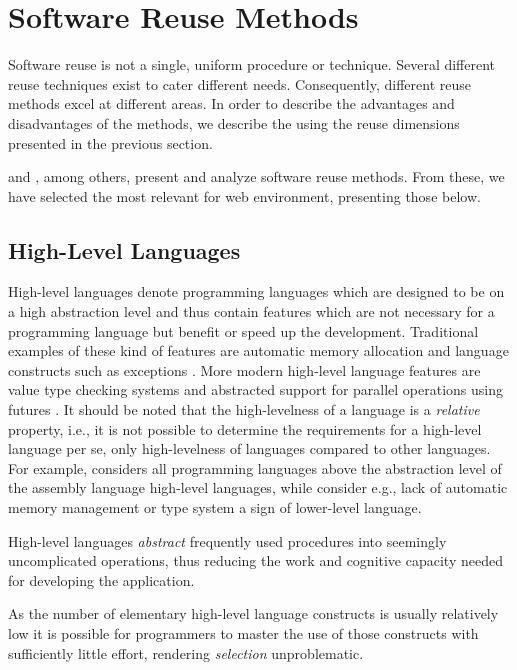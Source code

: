 \section{Software Reuse Methods}

Software reuse is not a single, uniform procedure or technique. Several different reuse techniques exist to cater different needs. Consequently, different reuse methods excel at different areas. In order to describe the advantages and disadvantages of the methods, we describe the using the reuse dimensions presented in the previous section.

\citet{krueger_software_1992} and \citet{johnson_frameworkscomponents+_1997}, among others, present and analyze software reuse methods. From these, we have selected the most relevant for web environment, presenting those below.

\subsection{High-Level Languages}
High-level languages denote programming languages which are designed to be on a high abstraction level and thus contain features which are not necessary for a programming language but benefit or speed up the development. Traditional examples of these kind of features are automatic memory allocation \citep{krueger_software_1992} and language constructs such as exceptions \citep{mitchell_concepts_2003}. More modern high-level language features are value type checking systems and abstracted support for parallel operations using futures \citep{totoo_haskell_2012}. It should be noted that the high-levelness of a language is a \emph{relative} property, i.e., it is not possible to determine the requirements for a high-level language per se, only high-levelness of languages compared to other languages. For example, \citet{krueger_software_1992} considers all programming languages above the abstraction level of the assembly language high-level languages, while \citet{carro_high-level_2006} consider e.g., lack of automatic memory management or type system a sign of lower-level language.

High-level languages \emph{abstract} frequently used procedures into seemingly uncomplicated operations, thus reducing the work and cognitive capacity needed for developing the application. \citep[chap.~3]{krueger_software_1992}

As the number of elementary high-level language constructs is usually relatively low it is possible for programmers to master the use of those constructs with sufficiently little effort, rendering \emph{selection} unproblematic. \citep[chap.~3]{krueger_software_1992}

